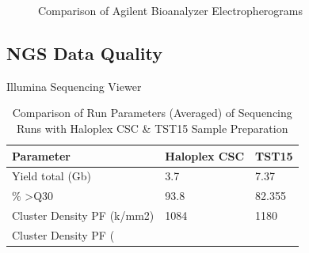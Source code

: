 \begin{figure}[!tbp]
  \centering
  \hfill
  \caption{Comparison of Agilent Bioanalyzer Electropherograms}
\end{figure}

\subsection{NGS Data Quality}

Illumina Sequencing Viewer

\begin{table}[!htbp]
    \caption[ISV]{Comparison of Run Parameters (Averaged) of Sequencing Runs with Haloplex CSC \& TST15 Sample Preparation}
    \centering
    \begin{tabular}{ |p{4cm}||p{4cm}||p{4cm}|}
    \hline
    Parameter & Haloplex CSC & TST15 \\ \hline \hline
    Yield total (Gb) & 3.7 & 7.37 \\ \hline
    \% \textgreater Q30 & 93.8 & 82.355 \\ \hline
    Cluster Density PF (k/mm2) & 1084 & 1180  \\ \hline
    Cluster Density PF (%
  \end{tabular}
\end{table}

